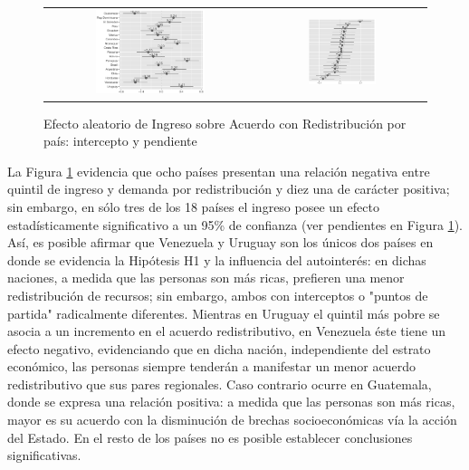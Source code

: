 \documentclass[12pt,letterpaper]{article}
\begin{document}
\begin{figure}
	\centering
	\begin{tabular}{cc}
		\includegraphics[width=0.54\textwidth]{Pend_Int02.pdf} & 
		\includegraphics[width=0.422\textwidth]{Pend_Ing02.pdf}
	\end{tabular}
	\caption{Efecto aleatorio de Ingreso sobre Acuerdo con Redistribución por país: intercepto y pendiente}
	\label{fig:ingaleatorio}
\end{figure}

La Figura \ref{fig:ingaleatorio} evidencia que ocho países presentan una relación negativa entre quintil de ingreso y demanda por redistribución y diez una de carácter positiva; sin embargo, en sólo tres de los 18 países el ingreso posee un efecto estadísticamente significativo a un 95\% de confianza (ver pendientes en Figura \ref{fig:ingaleatorio}). Así, es posible afirmar que Venezuela y Uruguay son los únicos dos países en donde se evidencia la Hipótesis H1 y la influencia del autointerés: en dichas naciones, a medida que las personas son más ricas, prefieren una menor redistribución de recursos; sin embargo, ambos con interceptos o "puntos de partida" radicalmente diferentes. Mientras en Uruguay el quintil más pobre se asocia a un incremento en el acuerdo redistributivo, en Venezuela éste tiene un efecto negativo, evidenciando que en dicha nación, independiente del estrato económico, las personas siempre tenderán a manifestar un menor acuerdo redistributivo que sus pares regionales. Caso contrario ocurre en Guatemala, donde se expresa una relación positiva: a medida que las personas son más ricas, mayor es su acuerdo con la disminución de brechas socioeconómicas vía la acción del Estado. En el resto de los países no es posible establecer conclusiones significativas.\\
\end{document}
